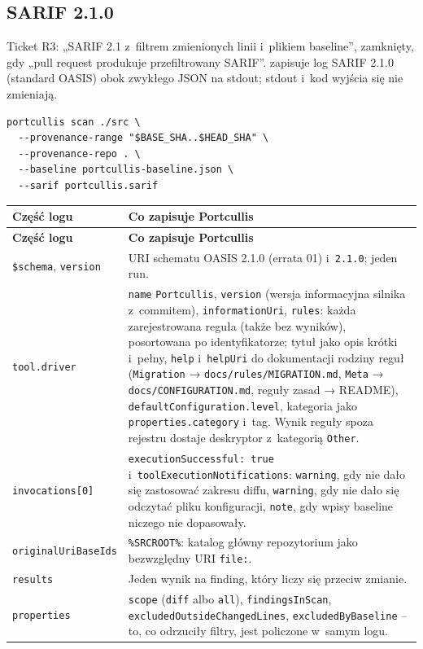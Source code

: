 \subsection{SARIF 2.1.0}\label{sec:portcullis-sarif}

Ticket R3: „SARIF 2.1 z~filtrem zmienionych linii i~plikiem baseline”, zamknięty, gdy „pull
request produkuje przefiltrowany SARIF”.  zapisuje log SARIF
2.1.0 (standard OASIS) obok zwykłego JSON na stdout; stdout i~kod wyjścia się nie zmieniają.

\begin{lstlisting}
portcullis scan ./src \
  --provenance-range "$BASE_SHA..$HEAD_SHA" \
  --provenance-repo . \
  --baseline portcullis-baseline.json \
  --sarif portcullis.sarif
\end{lstlisting}

\begingroup\small
\begin{xltabular}{\linewidth}{@{}>{\raggedright\arraybackslash}p{3.6cm} >{\raggedright\arraybackslash}X@{}}
\toprule
\textbf{Część logu} & \textbf{Co zapisuje Portcullis} \\
\midrule
\endfirsthead
\toprule
\textbf{Część logu} & \textbf{Co zapisuje Portcullis} \\
\midrule
\endhead
\texttt{\$schema}, \texttt{version} & URI schematu OASIS 2.1.0 (errata 01) i~\texttt{2.1.0}; jeden run. \\
\texttt{tool.driver} & \texttt{name} \texttt{Portcullis}, \texttt{version} (wersja informacyjna silnika z~commitem), \texttt{informationUri}, \texttt{rules}: każda zarejestrowana reguła (także bez wyników), posortowana po identyfikatorze; tytuł jako opis krótki i~pełny, \texttt{help} i~\texttt{helpUri} do dokumentacji rodziny reguł (\texttt{Migration} → \texttt{docs/rules/MIGRATION.md}, \texttt{Meta} → \texttt{docs/CONFIGURATION.md}, reguły zasad → README), \texttt{defaultConfiguration.level}, kategoria jako \texttt{properties.category} i~tag. Wynik reguły spoza rejestru dostaje deskryptor z~kategorią \texttt{Other}. \\
\texttt{invocations[0]} & \texttt{executionSuccessful: true} i~\texttt{toolExecutionNotifications}: \texttt{warning}, gdy nie dało się zastosować zakresu diffu, \texttt{warning}, gdy nie dało się odczytać pliku konfiguracji, \texttt{note}, gdy wpisy baseline niczego nie dopasowały. \\
\texttt{originalUriBaseIds} & \texttt{\%SRCROOT\%}: katalog główny repozytorium jako bezwzględny URI \texttt{file:}. \\
\texttt{results} & Jeden wynik na finding, który liczy się przeciw zmianie. \\
\texttt{properties} & \texttt{scope} (\texttt{diff} albo \texttt{all}), \texttt{findingsInScan}, \texttt{excludedOutsideChangedLines}, \texttt{excludedByBaseline} -- to, co odrzuciły filtry, jest policzone w~samym logu. \\
\bottomrule
\end{xltabular}
\endgroup

